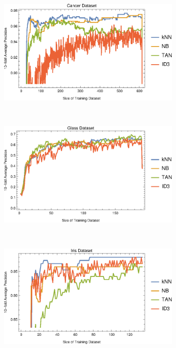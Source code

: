 \documentclass{article}
\begin{document}
	
		\label{conv}
		\begin{figure}[h!]
			\centering
			\begin{subfigure}[b]{0.49\textwidth}
				\centering
				\includegraphics[width=\textwidth]{figs/plot_conv_cancer}		
				\caption{}	
				\label{conv_cancer}		
			\end{subfigure}	\	
			\begin{subfigure}[b]{0.49\textwidth}
				\centering
				\includegraphics[width=\textwidth]{figs/plot_conv_glass}
				\caption{}
				\label{conv_glass}					
			\end{subfigure} \	
			\begin{subfigure}[b]{0.49\textwidth}
				\centering
				\includegraphics[width=\textwidth]{figs/plot_conv_iris}	

\end{subfigure}
\end{figure}
\end{document}
